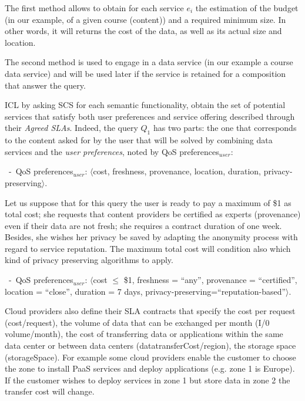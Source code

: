  

The first method allows to obtain for each service $e_i$ the estimation of the budget (in our example, of a given course (content)) and a required minimum size. In other words, it will returns the cost of the data, as well as its actual size and location.
 
The second method is used to engage in a data service (in our example a course data service) and will be used later if the service is retained for a composition that answer the query.

 

ICL by asking SCS for each semantic functionality, obtain the set of potential services that satisfy both user preferences and  service offering described through their \textit{Agreed SLAs}. 
Indeed, the query $Q_1$ has two parts: the one that corresponds to the content asked for by the user  that will be solved by combining data services and the \textit{user preferences}, noted by {QoS preferences}$_\mathit{user}$:
\begin{trivlist}\sf\footnotesize
\item[~-~QoS preferences$_\mathit{user}$: ] $\langle$cost, freshness, provenance, location, duration, privacy-preserving$\rangle$. 
\end{trivlist}

\color{black}

Let us suppose that for this query the user is ready to pay a maximum of \$1 as total cost; she requests that content providers be certified as experts (provenance) even if their data are not fresh; she requires a contract duration of one week. Besides, she wishes her privacy be saved by adapting the anonymity process with regard to service reputation. The maximum total cost will condition also which kind of privacy preserving algorithms to apply.
 
\begin{trivlist}\sf\footnotesize
\item[~-~QoS preferences$_\mathit{user}$: ] $\langle$cost $\leq$ \$1, freshness = ``any'', provenance = ``certified'', location = ``close'', duration = 7 days, privacy-preserving=``reputation-based''$\rangle$. 
\end{trivlist}



Cloud providers also define their SLA contracts that specify the cost per request ({cost/request}), the volume of data that can be exchanged per month ({I/0 volume/month}), the cost of transferring data or applications within the same data center or between data centers ({datatransferCost/region}), the storage space ({storageSpace}). For example some cloud providers enable the customer to choose the zone to install PaaS services and deploy applications (e.g. zone 1 is Europe). If the customer wishes to deploy services in zone 1 but store data in zone 2 the transfer cost will change.

